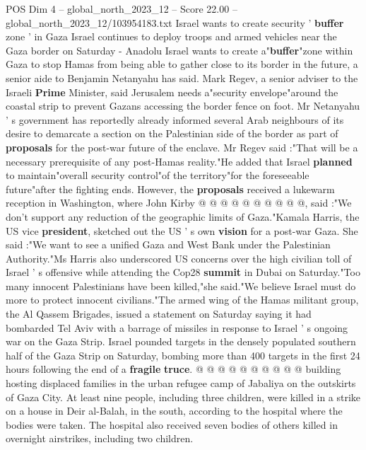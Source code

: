 \begin{textsample}{POS Dim 4 – global\_north\_2023\_12 – Score 22.00 – global\_north\_2023\_12/103954183.txt}  \label{ex:f4_pos_311}
Israel wants to create security ' \textbf{buffer} zone ' in Gaza Israel continues to deploy troops and armed vehicles near the Gaza border on Saturday - Anadolu Israel wants to create a"\textbf{buffer}"zone within Gaza to stop Hamas from being able to gather close to its border in the future, a senior aide to Benjamin Netanyahu has said.
Mark Regev, a senior adviser to the Israeli \textbf{Prime} Minister, said Jerusalem needs a"security envelope"around the coastal strip to prevent Gazans accessing the border fence on foot.
Mr Netanyahu ' s government has reportedly already informed several Arab neighbours of its desire to demarcate a section on the Palestinian side of the border as part of \textbf{proposals} for the post-war future of the enclave.
Mr Regev said :"That will be a necessary prerequisite of any post-Hamas reality."He added that Israel \textbf{planned} to maintain"overall security control"of the territory"for the foreseeable future"after the fighting ends.
However, the \textbf{proposals} received a lukewarm reception in Washington, where John Kirby @ @ @ @ @ @ @ @ @ @, said :"We don't support any reduction of the geographic limits of Gaza."Kamala Harris, the US vice \textbf{president}, sketched out the US ' s own \textbf{vision} for a post-war Gaza.
She said :"We want to see a unified Gaza and West Bank under the Palestinian Authority."Ms Harris also underscored US concerns over the high civilian toll of Israel ' s offensive while attending the Cop28 \textbf{summit} in Dubai on Saturday."Too many innocent Palestinians have been killed,"she said."We believe Israel must do more to protect innocent civilians."The armed wing of the Hamas militant group, the Al Qassem Brigades, issued a statement on Saturday saying it had bombarded Tel Aviv with a barrage of missiles in response to Israel ' s ongoing war on the Gaza Strip.
Israel pounded targets in the densely populated southern half of the Gaza Strip on Saturday, bombing more than 400 targets in the first 24 hours following the end of a \textbf{fragile} \textbf{truce}. @ @ @ @ @ @ @ @ @ @ building hosting displaced families in the urban refugee camp of Jabaliya on the outskirts of Gaza City.
At least nine people, including three children, were killed in a strike on a house in Deir al-Balah, in the south, according to the hospital where the bodies were taken.
The hospital also received seven bodies of others killed in overnight airstrikes, including two children.

\end{textsample}
